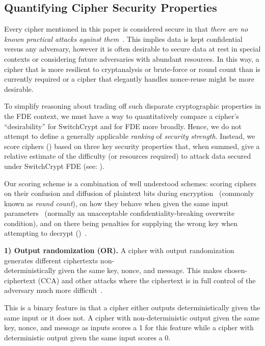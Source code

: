 \subsection{Quantifying Cipher Security Properties} \label{subsec:quantify}

Every cipher mentioned in this paper is considered secure in that \emph{there
are no known practical attacks against them}~\cite{All, Ciphers, Again}. This
implies data is kept confidential versus any adversary, however it is often
desirable to secure data at rest in special contexts or considering future
adversaries with abundant resources. In this way, a cipher that is more
resilient to cryptanalysis or brute-force or round count than is currently
required or a cipher that elegantly handles nonce-reuse might be more desirable.

To simplify reasoning about trading off such disparate cryptographic properties
in the FDE context, we must have a way to quantitatively compare a cipher's
``desirability'' for SwitchCrypt and for FDE more broadly. Hence, we do not
attempt to define a generally applicable \textit{ranking} of \emph{security
strength}. Instead, we score ciphers () based
on three key security properties that, when summed, give a relative estimate of
the difficulty (or resources required) to attack data secured under SwitchCrypt
FDE (see: ).

Our scoring scheme is a combination of well understood schemes: scoring ciphers
on their confusion and diffusion of plaintext bits during
encryption~\cite{MicrosoftCryptanalysisAES,SchneiersOnRounds} (commonly known as
\emph{round count}), on how they behave when given the same input
parameters~\cite{random-output1,Freestyle,random-output2} (normally an
unacceptable confidentiality-breaking overwrite condition), and on there being
penalties for supplying the wrong key when attempting to decrypt ()~\cite{scrypt,Freestyle,others2}.

\textbf{1) Output randomization (OR).} A cipher with output randomization
generates different ciphertexts non-\\deterministically given the same key,
nonce, and message. This makes chosen-ciphertext (CCA) and other attacks where
the ciphertext is in full control of the adversary much more
difficult~\cite{Freestyle}.

This is a binary feature in that a cipher either outputs deterministically given
the same input or it does not. A cipher with non-deterministic output given the
same key, nonce, and message as inputs scores a 1 for this feature while a
cipher with deterministic output given the same input scores a 0.

